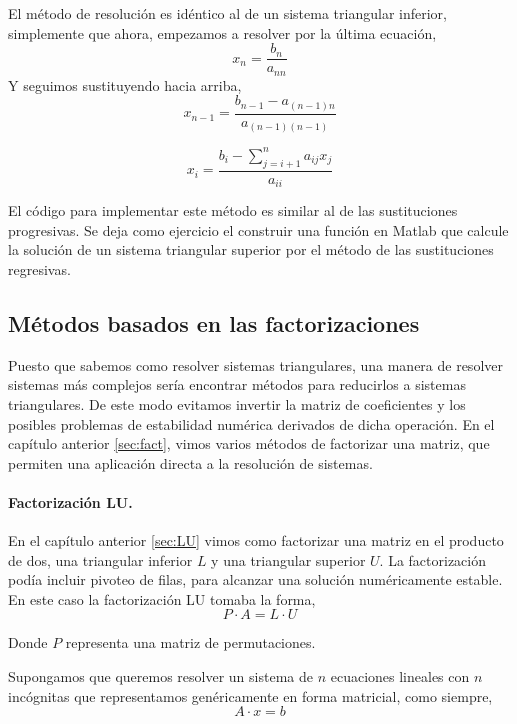 El método de resolución es idéntico al de un sistema triangular inferior, simplemente que ahora, empezamos a resolver por la última ecuación,
\begin{equation*}
x_n=\frac{b_n}{a_{nn}}
\end{equation*}
Y seguimos sustituyendo hacia arriba,
\begin{equation*}
x_{n-1}=\frac{b_{n-1}-a_{(n-1)n}}{a_{(n-1)(n-1)}}
\end{equation*}

\begin{equation*}
x_i=\frac{b_i-\sum_{j=i+1}^{n}a_{ij}x_j}{a_{ii}}
\end{equation*}

El código para implementar este método es similar al de las sustituciones progresivas. Se deja como ejercicio el construir una función en Matlab que calcule la solución de un sistema triangular superior por el método de las sustituciones regresivas.


\subsection{Métodos basados en las factorizaciones}
Puesto que sabemos como resolver sistemas triangulares, una manera de resolver sistemas más complejos sería encontrar métodos para reducirlos a sistemas triangulares. De este modo evitamos invertir la matriz de coeficientes y los posibles problemas de estabilidad numérica derivados de dicha operación. En el capítulo anterior \ref{sec:fact}, vimos varios métodos de factorizar una matriz, que permiten una aplicación directa a la resolución de sistemas.
\paragraph{Factorización LU.} En el capítulo anterior \ref{sec:LU} vimos como factorizar una matriz en el producto de dos, una triangular inferior $L$ y una triangular superior $U$. La factorización podía incluir pivoteo de filas, para alcanzar una solución numéricamente estable. En este caso la factorización LU tomaba la forma,
\begin{equation*}
P\cdot A = L\cdot U
\end{equation*}

Donde $P$ representa una matriz de permutaciones.

Supongamos que queremos resolver un sistema de $n$ ecuaciones lineales con $n$ incógnitas que representamos genéricamente en forma matricial, como siempre,
\begin{equation*}
A\cdot x=b
\end{equation*}

